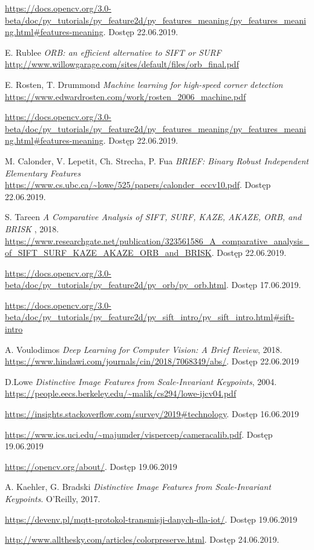 \documentclass[12pt,twoside,polish]{article}
\begin{document}
\begin{thebibliography}{11}
\url{https://docs.opencv.org/3.0-beta/doc/py_tutorials/py_feature2d/py_features_meaning/py_features_meaning.html#features-meaning}. Dostęp 22.06.2019.

E. Rublee \emph{ORB: an efficient alternative to SIFT or SURF}
\url{http://www.willowgarage.com/sites/default/files/orb_final.pdf}

E. Rosten, T. Drummond \emph{Machine learning for high-speed corner detection}
\url{https://www.edwardrosten.com/work/rosten_2006_machine.pdf}

\url{https://docs.opencv.org/3.0-beta/doc/py_tutorials/py_feature2d/py_features_meaning/py_features_meaning.html#features-meaning}. Dostęp 22.06.2019.

M. Calonder, V. Lepetit, Ch. Strecha, P. Fua \emph{BRIEF: Binary Robust Independent Elementary Features}
\url{https://www.cs.ubc.ca/~lowe/525/papers/calonder_eccv10.pdf}. Dostęp 22.06.2019.

S. Tareen \emph{A Comparative Analysis of SIFT, SURF, KAZE, AKAZE, ORB, and BRISK }, 2018.
\url{https://www.researchgate.net/publication/323561586_A_comparative_analysis_of_SIFT_SURF_KAZE_AKAZE_ORB_and_BRISK}. Dostęp 22.06.2019.

\url{https://docs.opencv.org/3.0-beta/doc/py_tutorials/py_feature2d/py_orb/py_orb.html}. Dostęp 17.06.2019.

\url{https://docs.opencv.org/3.0-beta/doc/py_tutorials/py_feature2d/py_sift_intro/py_sift_intro.html#sift-intro}

A. Voulodimos \emph{Deep Learning for Computer Vision: A Brief Review}, 2018.
\url{https://www.hindawi.com/journals/cin/2018/7068349/abs/}. Dostęp 22.06.2019

D.Lowe \emph{Distinctive Image Features from Scale-Invariant Keypoints}, 2004.
\url{https://people.eecs.berkeley.edu/~malik/cs294/lowe-ijcv04.pdf}

\url{https://insights.stackoverflow.com/survey/2019\#technology}. Dostęp 16.06.2019

\url{https://www.ics.uci.edu/~majumder/vispercep/cameracalib.pdf}. Dostęp 19.06.2019

\url{https://opencv.org/about/}. Dostęp 19.06.2019

A. Kaehler, G. Bradski \emph{Distinctive Image Features from Scale-Invariant Keypoints}. O'Reilly, 2017.

\url{https://devenv.pl/mqtt-protokol-transmisji-danych-dla-iot/}. Dostęp 19.06.2019

\url{http://www.allthesky.com/articles/colorpreserve.html}. Dostęp 24.06.2019.


\end{thebibliography}

\clearpage

\makesummary
\end{document}
